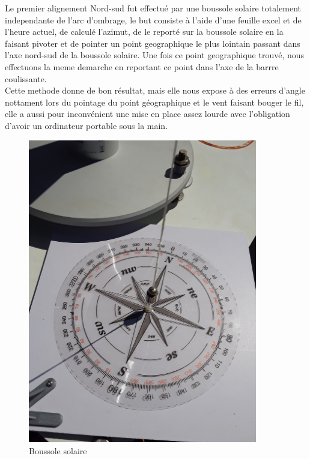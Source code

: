 \documentclass[12pt,a4paper]{article}
\begin{document}
\begin{flushleft}
Le premier alignement Nord-sud fut effectué par une boussole solaire totalement independante de l'arc d'ombrage, le but consiste à l'aide d'une feuille excel et de l'heure actuel, de calculé l'azimut, de le reporté sur la boussole solaire en la faisant pivoter et de pointer un point geographique le plus lointain passant dans l'axe nord-sud de la boussole solaire. Une fois ce point geographique trouvé, nous effectuons la meme demarche en reportant ce point dans l'axe de la barrre coulissante.\\

Cette methode donne de bon résultat, mais elle nous expose à des erreurs d'angle nottament lors du pointage du point géographique et le vent faisant bouger le fil, elle a aussi pour inconvénient une mise en place assez lourde avec l'obligation d'avoir un ordinateur portable sous la main.\\	

\begin{figure}[H]
\centering
\includegraphics[width=10cm, angle=-90]{image/montage/5.jpg} 
\caption{Boussole solaire}
\end{figure}


\end{flushleft}
\end{document}
